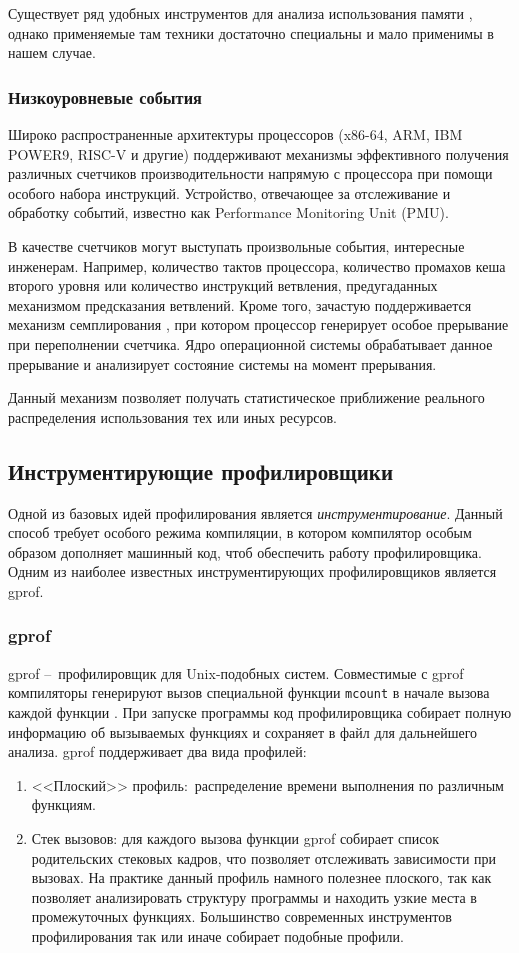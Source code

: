 Существует ряд удобных инструментов для анализа использования памяти \cite{valgrind} \cite{gperftools} \cite{tcmalloc:hp}, однако
применяемые там техники достаточно специальны и мало применимы в нашем случае.

\subsubsection{Низкоуровневые события}
Широко распространенные архитектуры процессоров (x86-64, ARM, IBM POWER9, RISC-V и другие)
поддерживают механизмы эффективного получения различных счетчиков производительности
напрямую с процессора при помощи особого набора инструкций.
Устройство, отвечающее за отслеживание и обработку событий, известно как Performance Monitoring Unit (PMU).

В качестве счетчиков могут выступать произвольные события, интересные инженерам.
Например, количество тактов процессора, количество промахов кеша второго уровня или количество
инструкций ветвления, предугаданных механизмом предсказания ветвлений.
Кроме того, зачастую поддерживается механизм семплирования \cite{linux:pmi}, при котором процессор генерирует
особое прерывание при переполнении счетчика. Ядро операционной системы обрабатывает
данное прерывание и анализирует состояние системы на момент прерывания.

Данный механизм позволяет получать статистическое приближение реального распределения использования тех или иных ресурсов.

\subsection{Инструментирующие профилировщики}
Одной из базовых идей профилирования является \textit{инструментирование}. Данный способ требует особого режима компиляции, в котором компилятор особым образом дополняет машинный код, чтоб обеспечить работу профилировщика. Одним из наиболее известных инструментирующих профилировщиков является gprof.

\subsubsection{gprof}
gprof \cite{gprof} – профилировщик для Unix-подобных систем. Совместимые с gprof компиляторы генерируют вызов специальной функции \lstinline!mcount! в начале вызова каждой функции \cite{gprof:mcount}. При запуске программы код профилировщика собирает полную информацию об вызываемых функциях и сохраняет в файл для дальнейшего анализа.
gprof поддерживает два вида профилей:
\begin{enumerate}
    \item <<Плоский>> профиль: распределение времени выполнения по различным функциям.
    \item Стек вызовов: для каждого вызова функции gprof собирает список родительских стековых кадров, что позволяет отслеживать зависимости при вызовах. На практике данный профиль намного полезнее плоского, так как позволяет анализировать структуру программы и находить узкие места в промежуточных функциях. Большинство современных инструментов профилирования так или иначе собирает подобные профили.
\end{enumerate}

